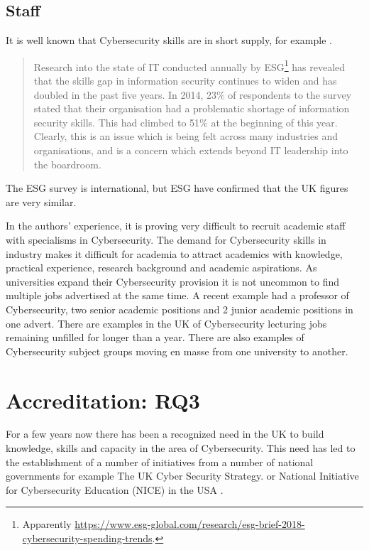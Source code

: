 \documentclass[conference]{IEEEtran}
\begin{document}
\subsection{Staff}
It is well known that Cybersecurity skills are in short supply, for example \cite{Page2018a}.
\begin{quote}
Research into the state of IT conducted annually by ESG\footnote{Apparently \url{https://www.esg-global.com/research/esg-brief-2018-cybersecurity-spending-trends}.} has revealed that the skills gap in information security continues to widen and has doubled in the past five years. In 2014, 23\% of respondents to the survey stated that their organisation had a problematic shortage of information security skills. This had climbed to 51\% at the beginning of this year. Clearly, this is an issue which is being felt across many industries and organisations, and is a concern which extends beyond IT leadership into the boardroom.
\end{quote}
The ESG survey is international, but ESG have confirmed that the UK figures are very similar.

In the authors' experience, it is proving very difficult to recruit academic staff with specialisms in Cybersecurity. The demand for Cybersecurity skills in industry makes it difficult for academia to attract academics with knowledge, practical experience, research background and academic aspirations. As universities expand their Cybersecurity provision it is not uncommon to find multiple jobs advertised at the same time.  A recent example had a professor of Cybersecurity, two senior academic positions and 2 junior academic positions in one advert. There are examples in the UK of Cybersecurity lecturing jobs remaining unfilled for longer than a year. There are also examples of  Cybersecurity subject groups moving en masse from one university to another.



\section{Accreditation: RQ3}

For a few years now there has been a recognized need in the UK to build knowledge, skills and capacity in the area of Cybersecurity. This need has led to the establishment of a number of initiatives from a number of national governments for example The UK Cyber Security Strategy. \cite{UKCabinetOffice} or National Initiative for Cybersecurity Education (NICE) in the USA \cite{NICE}. 
\end{document}
